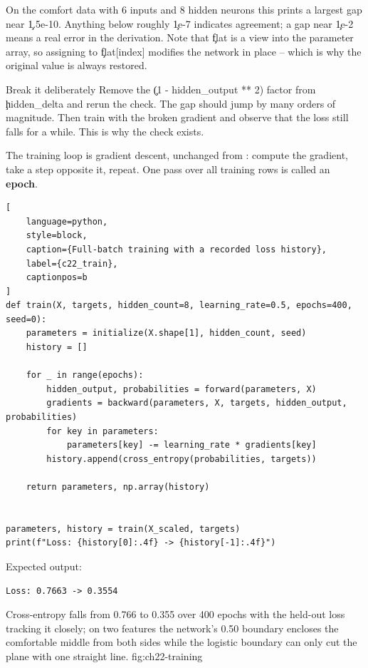On the comfort data with 6 inputs and 8 hidden neurons this prints a largest gap
near \c{1.5e-10}. Anything below roughly \c{1e-7} indicates agreement; a gap near
\c{1e-2} means a real error in the derivation. Note that \c{flat} is a view into
the parameter array, so assigning to \c{flat[index]} modifies the network in
place -- which is why the original value is always restored.

\begin{TryBox}{Break it deliberately}
Remove the \c{(1 - hidden_output ** 2)} factor from \c{hidden_delta} and rerun
the check. The gap should jump by many orders of magnitude. Then train with the
broken gradient and observe that the loss still falls for a while. This is why
the check exists.
\end{TryBox}


The training loop is gradient descent, unchanged from
: compute the gradient, take a step opposite it,
repeat. One pass over all training rows is called an \textbf{epoch}.

\begin{lstlisting}[
    language=python,
    style=block,
    caption={Full-batch training with a recorded loss history},
    label={c22_train},
    captionpos=b
]
def train(X, targets, hidden_count=8, learning_rate=0.5, epochs=400, seed=0):
    parameters = initialize(X.shape[1], hidden_count, seed)
    history = []

    for _ in range(epochs):
        hidden_output, probabilities = forward(parameters, X)
        gradients = backward(parameters, X, targets, hidden_output, probabilities)
        for key in parameters:
            parameters[key] -= learning_rate * gradients[key]
        history.append(cross_entropy(probabilities, targets))

    return parameters, np.array(history)


parameters, history = train(X_scaled, targets)
print(f"Loss: {history[0]:.4f} -> {history[-1]:.4f}")
\end{lstlisting}

Expected output:

\begin{lstlisting}[language=text, style=block, caption={400 epochs of full-batch descent}, label={c22_train_output}, captionpos=b]
Loss: 0.7663 -> 0.3554
\end{lstlisting}

{Cross-entropy falls from 0.766 to 0.355 over 400 epochs with the held-out loss tracking it closely; on two features the network's 0.50 boundary encloses the comfortable middle from both sides while the logistic boundary can only cut the plane with one straight line.}
{fig:ch22-training}

